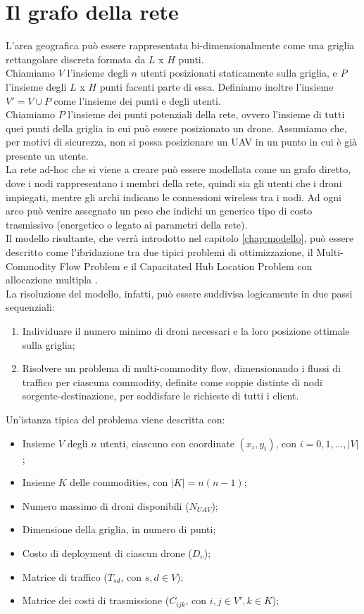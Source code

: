 \section{Il grafo della rete} \label{sect:graforete}
L'area geografica può essere rappresentata bi-dimensionalmente come una griglia rettangolare discreta formata da $L$ x $H$ punti. \\
Chiamiamo $V$ l'insieme degli $n$ utenti posizionati staticamente sulla griglia, e $P$ l'insieme degli $L$ x $H$ punti facenti parte di essa. Definiamo inoltre l'insieme $V' = V \cup P$ come l'insieme dei punti e degli utenti. \\
Chiamiamo $P$ l'insieme dei punti potenziali della rete, ovvero l'insieme di tutti quei punti della griglia in cui può essere posizionato un drone. Assumiamo che, per motivi di sicurezza, non si possa posizionare un UAV in un punto in cui è già presente un utente. \\
La rete ad-hoc che si viene a creare può essere modellata come un grafo diretto, dove i nodi rappresentano i membri della rete, quindi sia gli utenti che i droni impiegati, mentre gli archi indicano le connessioni wireless tra i nodi. Ad ogni arco può venire assegnato un peso che indichi un generico tipo di costo trasmissivo (energetico o legato ai parametri della rete). \\


Il modello risultante, che verrà introdotto nel capitolo \ref{chap:modello}, può essere descritto come l'ibridazione tra due tipici problemi di ottimizzazione, il Multi-Commodity Flow Problem e il Capacitated Hub Location Problem con allocazione multipla \cite{Alumur20081}. \\
La risoluzione del modello, infatti, può essere suddivisa logicamente in due passi sequenziali:
\begin{enumerate}  
	\item Individuare il numero minimo di droni necessari e la loro posizione ottimale sulla griglia; 
	\item Risolvere un problema di multi-commodity flow, dimensionando i flussi di traffico per ciascuna commodity, definite come coppie distinte di nodi sorgente-destinazione, per soddisfare le richieste di tutti i client.
\end{enumerate}
Un'istanza tipica del problema viene descritta con:
\begin{itemize}  
	\item Insieme $V$ degli $n$ utenti, ciascuno con coordinate $(x_i,y_i)$, con $i = 0,1,...,|V|$;
	\item Insieme $K$ delle commodities, con $|K| = n (n-1)$;
	\item Numero massimo di droni disponibili ($N_{UAV}$);
	\item Dimensione della griglia, in numero di punti;
	\item Costo di deployment di ciascun drone ($D_v$); 
	\item Matrice di traffico ($T_{sd}$, con $s,d \in V$);
	\item Matrice dei costi di trasmissione ($C_{ijk}$, con $i,j \in V', k \in K$);
\end{itemize}

